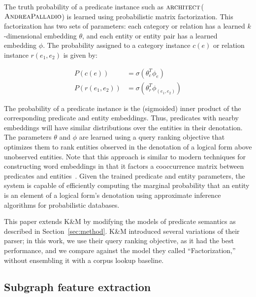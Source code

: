 \documentclass[11pt]{article}
\newcommand{\secref}[1]{Section~\ref{sec:#1}}
\newcommand{\predicate}[1]{\ensuremath{\textsc{#1}}}
\newcommand{\entity}[1]{\ensuremath{\textsc{#1}}}
\begin{document}
The truth probability of a predicate instance such as
\predicate{architect}(\entity{AndreaPalladio}) is learned using
probabilistic matrix factorization. This factorization has two sets of
parameters: each category or relation has a learned $k$-dimensional
embedding $\theta$, and each entity or entity pair has a learned
embedding $\phi$. The probability assigned to a category instance
$c(e)$ or relation instance $r(e_1, e_2)$ is given by:

\begin{align*}
  P(c(e)) &= \sigma ( \theta_c^T \phi_e ) \\
  P(r(e_1, e_2)) &= \sigma ( \theta_r^T \phi_{(e_1, e_2)} )
\end{align*}

The probability of a predicate instance is the (sigmoided) inner
product of the corresponding predicate and entity embeddings. Thus,
predicates with nearby embeddings will have similar distributions over
the entities in their denotation. The parameters $\theta$ and $\phi$
are learned using a query ranking objective that optimizes them to
rank entities observed in the denotation of a logical form above
unobserved entities. Note that this approach is similar to modern
techniques for constructing word embeddings in that it factors a
cooccurrence matrix between predicates and
entities~\cite{levy-2014-w2v-as-mf}. Given the trained predicate and
entity parameters, the system is capable of efficiently computing the
marginal probability that an entity is an element of a logical form's
denotation using approximate inference algorithms for probabilistic
databases.

This paper extends K\&M by modifying the models of predicate semantics
as described in \secref{method}. K\&M introduced several variations of
their parser; in this work, we use their query ranking objective, as
it had the best performance, and we compare against the model they
called ``Factorization,'' without ensembling it with a corpus lookup
baseline.

\subsection{Subgraph feature extraction}
\end{document}
